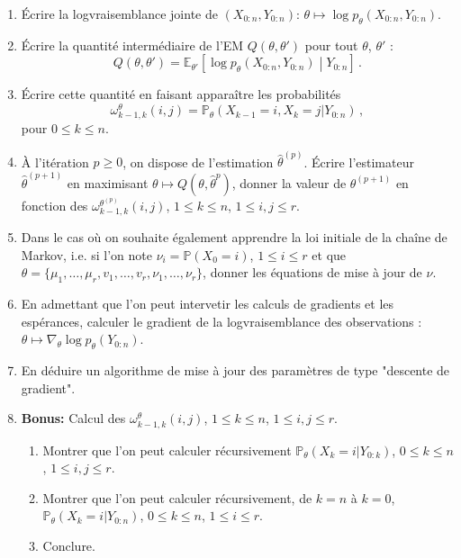 \documentclass[a4paper,10pt,fleqn]{article}
\newcommand{\1}{\ensuremath{\mathbbm{1}}}
\begin{document}
\begin{enumerate}
\item \'Ecrire la logvraisemblance jointe de $(X_{0:n},Y_{0:n})$: $\theta \mapsto \log p_\theta (X_{0:n},Y_{0:n})$.
\item \'Ecrire la quantit\'e interm\'ediaire de l'EM $Q(\theta,\theta')$ pour tout $\theta$, $\theta'$ :
$$
Q(\theta,\theta') = \mathbb{E}_{\theta'}\left[\log p_\theta (X_{0:n},Y_{0:n})\middle |Y_{0:n}\right]\,.
$$
\item \'Ecrire cette quantit\'e en faisant appara\^itre les probabilit\'es
$$
\omega_{k-1,k}^{\theta}(i,j) = \mathbb{P}_{\theta}\left(X_{k-1}=i,X_k=j|Y_{0:n}\right)\,,
$$
pour $0\leq k \leq n$.
\item \`A l'it\'eration $p\geq 0$, on dispose de l'estimation $\hat\theta^{(p)}$. \'Ecrire l'estimateur $\hat\theta^{(p+1)}$ en maximisant $\theta\mapsto Q(\theta,\hat\theta^{p})$, donner la valeur de $\theta^{(p+1)}$ en fonction des $\omega_{k-1,k}^{\theta^{(p)}}(i,j)$, $1\leq k \leq n$, $1\leq i, j \leq r$.
\item Dans le cas o\`u on souhaite \'egalement apprendre la loi initiale de la cha\^ine de Markov, i.e. si l'on note $\nu_i = \mathbb{P}(X_0=i)$, $1\leq i \leq r$ et que $\theta = \{\mu_1,\ldots,\mu_r,v_1,\ldots,v_r,\nu_1,\ldots,\nu_r\}$, donner les \'equations de mise \`a jour de $\nu$. 
\item En admettant que l'on peut intervetir les calculs de gradients et les esp\'erances, calculer le gradient de la logvraisemblance des observations : $\theta\mapsto\nabla_\theta \log p_\theta(Y_{0:n})$.
\item En d\'eduire un algorithme de mise \`a jour des param\`etres de type "descente de gradient".
\item {\bf Bonus:} Calcul des $\omega_{k-1,k}^{\theta}(i,j)$, $1\leq k \leq n$, $1\leq i, j \leq r$.
\begin{enumerate}
\item Montrer que l'on peut calculer r\'ecursivement $ \mathbb{P}_{\theta}\left(X_k=i|Y_{0:k}\right)$, $0\leq k \leq n$, $1\leq i, j \leq r$.
\item Montrer que l'on peut calculer r\'ecursivement, de $k=n$ \`a $k = 0$, $ \mathbb{P}_{\theta}\left(X_k=i|Y_{0:n}\right)$, $0\leq k \leq n$, $1\leq i\leq r$.
\item Conclure.
\end{enumerate}
\end{enumerate}
\end{document}

